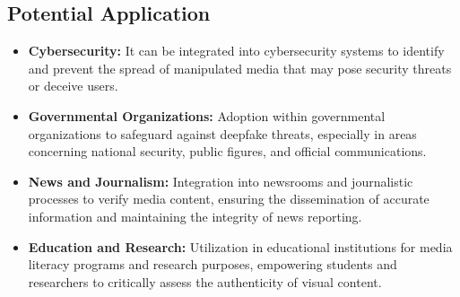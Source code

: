 \subsection{Potential Application}

\begin{itemize}
    \item \textbf{Cybersecurity:} It can be integrated into cybersecurity systems to identify and prevent the spread of manipulated media that may pose security threats or deceive users.
    
    \item \textbf{Governmental Organizations:} Adoption within governmental organizations to safeguard against deepfake threats, especially in areas concerning national security, public figures, and official communications.
    
    \item \textbf{News and Journalism:} Integration into newsrooms and journalistic processes to verify media content, ensuring the dissemination of accurate information and maintaining the integrity of news reporting.
    
    \item \textbf{Education and Research:} Utilization in educational institutions for media literacy programs and research purposes, empowering students and researchers to critically assess the authenticity of visual content.
\end{itemize}

